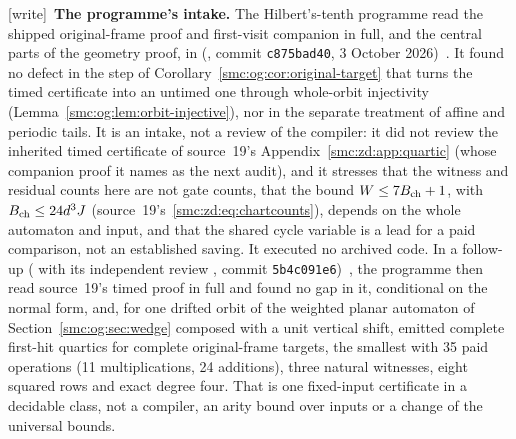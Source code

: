 \documentclass[11pt,letterpaper]{article}
\numberwithin{equation}{section}
\theoremstyle{definition}
\theoremstyle{remark}
\newcommand{\wtag}{\textup{[write]}}
\begin{document}
\wtag\ \textbf{The programme's intake.} The Hilbert's-tenth programme read the shipped original-frame proof and first-visit companion in full, and the central parts of the geometry proof, in  (, commit \texttt{c875bad40}, 3 October 2026)~\cite{reviewfirsthit}. It found no defect in the step of Corollary~\ref{smc:og:cor:original-target} that turns the timed certificate into an untimed one through whole-orbit injectivity (Lemma~\ref{smc:og:lem:orbit-injective}), nor in the separate treatment of affine and periodic tails. It is an intake, not a review of the compiler: it did not review the inherited timed certificate of source~19's Appendix~\ref{smc:zd:app:quartic} (whose companion proof it names as the next audit), and it stresses that the witness and residual counts here are not gate counts, that the bound $W\le7B_{\rm ch}+1$, with $B_{\rm ch}\le24d^3J$ (source~19's~\eqref{smc:zd:eq:chartcounts}), depends on the whole automaton and input, and that the shared cycle variable is a lead for a paid comparison, not an established saving. It executed no archived code. In a follow-up ( with its independent review , commit \texttt{5b4c091e6})~\cite{reviewfixture}, the programme then read source~19's timed proof in full and found no gap in it, conditional on the normal form, and, for one drifted orbit of the weighted planar automaton of Section~\ref{smc:og:sec:wedge} composed with a unit vertical shift, emitted complete first-hit quartics for complete original-frame targets, the smallest with 35 paid operations (11 multiplications, 24 additions), three natural witnesses, eight squared rows and exact degree four. That is one fixed-input certificate in a decidable class, not a compiler, an arity bound over inputs or a change of the universal bounds.
\end{document}
